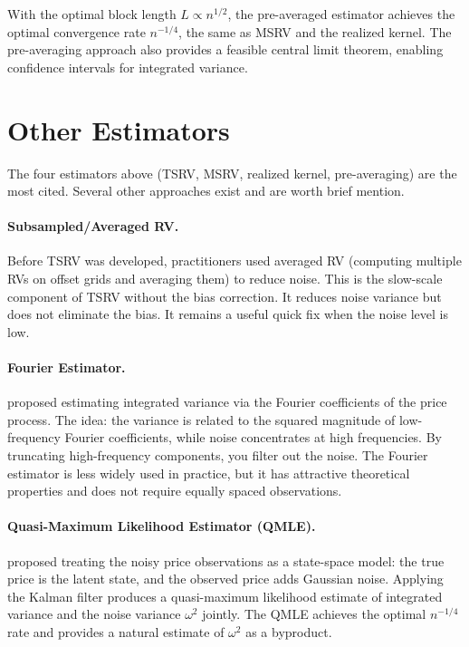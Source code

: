 \begin{keyresult}
With the optimal block length $L \propto n^{1/2}$, the pre-averaged estimator achieves the optimal convergence rate $n^{-1/4}$, the same as MSRV and the realized kernel.
The pre-averaging approach also provides a feasible central limit theorem, enabling confidence intervals for integrated variance.
\end{keyresult}


\section{Other Estimators}
\label{sec:other-estimators}

The four estimators above (TSRV, MSRV, realized kernel, pre-averaging) are the most cited.
Several other approaches exist and are worth brief mention.

\paragraph{Subsampled/Averaged RV.}
Before TSRV was developed, practitioners used averaged RV (computing multiple RVs on offset grids and averaging them) to reduce noise.
This is the slow-scale component of TSRV without the bias correction.
It reduces noise variance but does not eliminate the bias.
It remains a useful quick fix when the noise level is low.

\paragraph{Fourier Estimator.}
\citet{MalliavinMancino2002, MalliavinMancino2009} proposed estimating integrated variance via the Fourier coefficients of the price process.
The idea: the variance is related to the squared magnitude of low-frequency Fourier coefficients, while noise concentrates at high frequencies.
By truncating high-frequency components, you filter out the noise.
The Fourier estimator is less widely used in practice, but it has attractive theoretical properties and does not require equally spaced observations.

\paragraph{Quasi-Maximum Likelihood Estimator (QMLE).}
\citet{Xiu2010} proposed treating the noisy price observations as a state-space model: the true price is the latent state, and the observed price adds Gaussian noise.
Applying the Kalman filter produces a quasi-maximum likelihood estimate of integrated variance and the noise variance $\omega^2$ jointly.
The QMLE achieves the optimal $n^{-1/4}$ rate and provides a natural estimate of $\omega^2$ as a byproduct.

